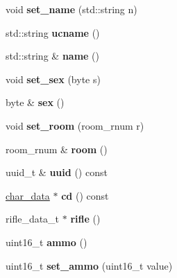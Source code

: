 \begin{DoxyCompactItemize}
void {\bfseries set\+\_\+name} (std\+::string n)
\item 
\mbox{\label{classmods_1_1player_af9dae273967126a811543ef1cacf71fb}} 
std\+::string {\bfseries ucname} ()
\item 
\mbox{\label{classmods_1_1player_a29dc752d622c697c4911a77a4b985564}} 
std\+::string \& {\bfseries name} ()
\item 
\mbox{\label{classmods_1_1player_adea83a95f7027e965f525cdfe0c2880a}} 
void {\bfseries set\+\_\+sex} (byte s)
\item 
\mbox{\label{classmods_1_1player_ab1ce04aa4ca73ab5e43e1a0f4cd6906f}} 
byte \& {\bfseries sex} ()
\item 
\mbox{\label{classmods_1_1player_ae6fdeb00bc88a130ea0ef27415ac2b4f}} 
void {\bfseries set\+\_\+room} (room\+\_\+rnum r)
\item 
\mbox{\label{classmods_1_1player_aa0f9420628b22ec1b716d6cbe11ef0ef}} 
room\+\_\+rnum \& {\bfseries room} ()
\item 
\mbox{\label{classmods_1_1player_a4b118187f4fb03ef695e8af157ecf530}} 
uuid\+\_\+t \& {\bfseries uuid} () const
\item 
\mbox{\label{classmods_1_1player_aefbbd982695743a6977d18ce4853749b}} 
\hyperlink{structchar__data}{char\+\_\+data} $\ast$ {\bfseries cd} () const
\item 
\mbox{\label{classmods_1_1player_a49ed68a4bed3cb05ea26da0f4c50e9d8}} 
rifle\+\_\+data\+\_\+t $\ast$ {\bfseries rifle} ()
\item 
\mbox{\label{classmods_1_1player_a66bf2cc10943dc00d629868dbb7bd862}} 
uint16\+\_\+t {\bfseries ammo} ()
\item 
\mbox{\label{classmods_1_1player_a8853a1fe58152214459fbb7417a21d83}} 
uint16\+\_\+t {\bfseries set\+\_\+ammo} (uint16\+\_\+t value)
\item 

\end{DoxyCompactItemize}

